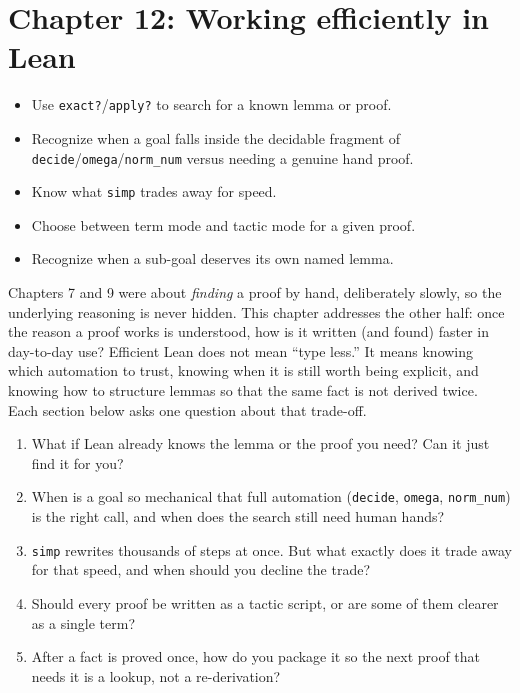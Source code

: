 \chapter{Chapter 12: Working efficiently in Lean}\label{sec:12-working-efficiently:00-index:1}

\begin{learningobjectives}
\begin{itemize}
\tightlist
\item
  Use \texttt{exact?}/\texttt{apply?} to search for a known lemma or proof.
\item
  Recognize when a goal falls inside the decidable fragment of \texttt{decide}/\texttt{omega}/\texttt{norm\_\allowbreak{}num} versus needing a genuine hand proof.
\item
  Know what \texttt{simp} trades away for speed.
\item
  Choose between term mode and tactic mode for a given proof.
\item
  Recognize when a sub-goal deserves its own named lemma.
\end{itemize}
\end{learningobjectives}


Chapters 7 and 9 were about \emph{finding} a proof by hand, deliberately slowly, so the underlying reasoning is never hidden. This chapter addresses the other half: once the reason a proof works is understood, how is it written (and found) faster in day-to-day use? Efficient Lean does not mean ``type less.'' It means knowing which automation to trust, knowing when it is still worth being explicit, and knowing how to structure lemmas so that the same fact is not derived twice. Each section below asks one question about that trade-off.

\begin{enumerate}
\def\labelenumi{\arabic{enumi}.}
\tightlist
\item
  What if Lean already knows the lemma or the proof you need? Can it just find it for you?
\item
  When is a goal so mechanical that full automation (\texttt{decide}, \texttt{omega}, \texttt{norm\_\allowbreak{}num}) is the right call, and when does the search still need human hands?
\item
  \texttt{simp} rewrites thousands of steps at once. But what exactly does it trade away for that speed, and when should you decline the trade?
\item
  Should every proof be written as a tactic script, or are some of them clearer as a single term?
\item
  After a fact is proved once, how do you package it so the next proof that needs it is a lookup, not a re-derivation?
\end{enumerate}







